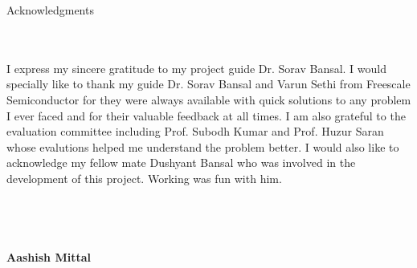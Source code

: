 \begin{center}
\LARGE{Acknowledgments} 
\end{center}
\ \\ \ \\
I express my sincere gratitude to my project guide Dr. Sorav Bansal. I would specially like to thank my guide Dr. Sorav Bansal and Varun Sethi from Freescale Semiconductor for they were always available with quick solutions to any problem I ever faced and for their valuable feedback at all times. I am also grateful to the evaluation committee including Prof. Subodh Kumar and Prof. Huzur Saran whose evalutions helped me understand the problem better. 
I would also like to acknowledge my fellow mate Dushyant Bansal who was involved in the development of this project. Working was fun with him.
\\
\\
\\
\\
\\
{\bfseries Aashish Mittal} \\

